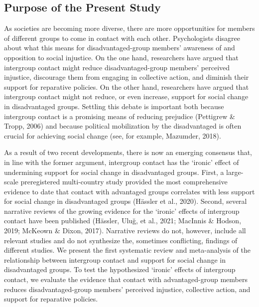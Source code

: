 \documentclass[12pt, letterpaper]{article}
\begin{document}
\hypertarget{purpose-of-the-present-study}{%
\subsection{Purpose of the Present
Study}\label{purpose-of-the-present-study}}

As societies are becoming more diverse, there are more opportunities for
members of different groups to come in contact with each other.
Psychologists disagree about what this means for disadvantaged-group
members' awareness of and opposition to social injustice. On the one
hand, researchers have argued that intergroup contact might reduce
disadvantaged-group members' perceived injustice, discourage them from
engaging in collective action, and diminish their support for reparative
policies. On the other hand, researchers have argued that intergroup
contact might not reduce, or even increase, support for social change in
disadvantaged groups. Settling this debate is important both because
intergroup contact is a promising means of reducing prejudice (Pettigrew
\& Tropp, 2006) and because political mobilization by the disadvantaged
is often crucial for achieving social change (see, for example,
Mazumder, 2018).

As a result of two recent developments, there is now an emerging
consensus that, in line with the former argument, intergroup contact has
the `ironic' effect of undermining support for social change in
disadvantaged groups. First, a large-scale preregistered multi-country
study provided the most comprehensive evidence to date that contact with
advantaged groups correlates with less support for social change in
disadvantaged groups (Hässler et al., 2020). Second, several narrative
reviews of the growing evidence for the `ironic' effects of intergroup
contact have been published (Hässler, Uluğ, et al., 2021; MacInnis \&
Hodson, 2019; McKeown \& Dixon, 2017). Narrative reviews do not,
however, include all relevant studies and do not synthesize the,
sometimes conflicting, findings of different studies. We present the
first systematic review and meta-analysis of the relationship between
intergroup contact and support for social change in disadvantaged
groups. To test the hypothesized `ironic' effects of intergroup contact,
we evaluate the evidence that contact with advantaged-group members
reduces disadvantaged-group members' perceived injustice, collective
action, and support for reparative policies.
\end{document}
